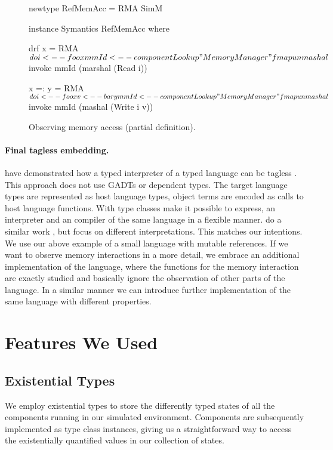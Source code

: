 \begin{figure}
\begin{code}
newtype RefMemAcc =  RMA SimM

instance Symantics RefMemAcc where

  drf x = RMA $ do
    i     <-- foo x
    mmId  <-- componentLookup "MemoryManager"
    fmap unmashal $ invoke mmId (marshal (Read i))

  x =: y = RMA $ do
    i     <-- foo x
    v     <-- bar y
    mmId  <-- componentLookup "MemoryManager"
    fmap unmashal $ invoke mmId (mashal (Write i v))
\end{code}
\vspace{-0.5em}
\caption{Observing memory access (partial definition).}
\vspace{-1em}
\label{lst_observing_memory_access}
\end{figure}


\paragraph{Final tagless embedding.}
\citeauthor{final_tagless_embedding} have demonstrated how a typed interpreter of a typed language can be tagless \cite{final_tagless_embedding}.
This approach does not use GADTs or dependent types.
The target language types are represented as host language types, object terms are encoded as calls to host language functions. With type classes \citeauthor{final_tagless_embedding} make it possible to express, \eg an interpreter and an compiler of the same language in a flexible manner.
\citeauthor{Hofer:2008:PED:1449913.1449935} do a similar work \cite{Hofer:2008:PED:1449913.1449935}, but focus on different interpretations.
This matches our intentions.
We use our above example of a small language with mutable references.
If we want to observe memory interactions in a more detail, we embrace an additional implementation of the language, where the functions for the memory interaction are exactly studied and basically ignore the observation of other parts of the language.
In a similar manner we can introduce further implementation of the same language with different properties.

\section{Features We Used}
\label{sec:impl-detail}

\subsection{Existential Types}
We employ existential types to store the differently typed states of all the components running in our simulated environment.
Components are subsequently implemented as type class instances, giving us a straightforward way to access the existentially quantified values in our collection of states.

